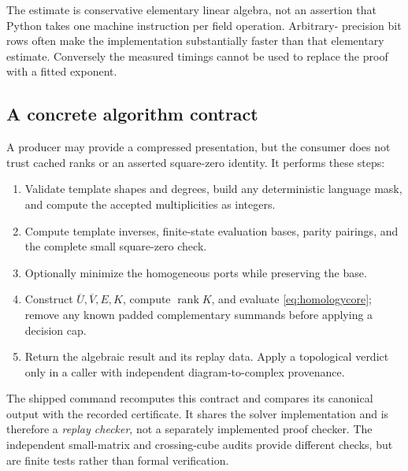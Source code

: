 \documentclass[11pt,letterpaper]{article}
\newcommand{\rk}{\operatorname{rank}}
\newcommand{\code}[1]{\texttt{\detokenize{#1}}}
\theoremstyle{definition}
\theoremstyle{remark}
\numberwithin{equation}{section}
\begin{document}
The estimate is conservative elementary linear algebra, not an assertion
that Python takes one machine instruction per field operation. Arbitrary-
precision bit rows often make the implementation substantially faster
than that elementary estimate. Conversely the measured timings cannot
be used to replace the proof with a fitted exponent.

\subsection{A concrete algorithm contract}
A producer may provide a compressed presentation, but the consumer does
not trust cached ranks or an asserted square-zero identity. It performs
these steps:
\begin{enumerate}[label=\arabic*.,leftmargin=*,itemsep=2pt]
\item Validate template shapes and degrees, build any deterministic language
mask, and compute the accepted multiplicities as integers.
\item Compute template inverses, finite-state evaluation bases, parity
pairings, and the complete small square-zero check.
\item Optionally minimize the homogeneous ports while preserving the base.
\item Construct $\overline U,\overline V,E,K$, compute $\rk K$, and evaluate
\eqref{eq:homologycore}; remove any known padded complementary summands
before applying a decision cap.
\item Return the algebraic result and its replay data. Apply a topological
verdict only in a caller with independent diagram-to-complex provenance.
\end{enumerate}
The shipped \code{verify} command recomputes this contract and compares
its canonical output with the recorded certificate. It shares the solver
implementation and is therefore a \emph{replay checker}, not a separately
implemented proof checker. The independent small-matrix and crossing-cube
audits provide different checks, but are finite tests rather than formal
verification.
\end{document}
